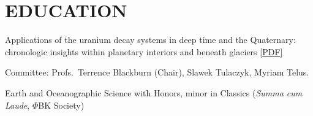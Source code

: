 \section{EDUCATION}

Applications of the uranium decay systems in deep time and the Quaternary: chronologic insights within planetary interiors and beneath glaciers [\href{https://escholarship.org/uc/item/0vp7r59z}{PDF}]

\quad Committee: Profs.~Terrence Blackburn (Chair), Slawek Tulaczyk, Myriam Telus.

Earth and Oceanographic Science with Honors, minor in Classics (\emph{Summa cum Laude}, $\Phi$BK Society)